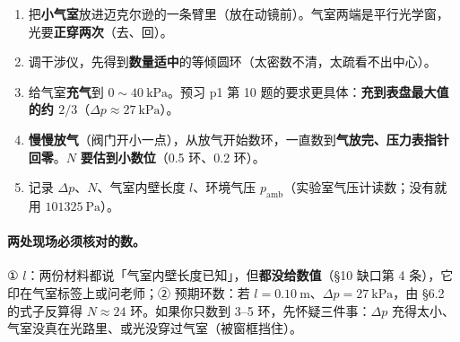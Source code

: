 \documentclass[11pt]{ctexart}
\begin{document}

\begin{enumerate}
\item 把\textbf{小气室}放进迈克尔逊的一条臂里（放在动镜前）。气室两端是平行光学窗，光要\textbf{正穿两次}（去、回）。
\item 调干涉仪，先得到\textbf{数量适中}的等倾圆环（太密数不清，太疏看不出中心）。
\item 给气室\textbf{充气}到 \(0\sim40\ \mathrm{kPa}\)。预习 p1 第 10 题的要求更具体：\textbf{充到表盘最大值的约 \(2/3\)}（\(\Delta p\approx27\ \mathrm{kPa}\)）。
\item \textbf{慢慢放气}（阀门开小一点），从放气开始数环，一直数到\textbf{气放完、压力表指针回零}。\(N\) \textbf{要估到小数位}（0.5 环、0.2 环）。
\item 记录 \(\Delta p\)、\(N\)、气室内壁长度 \(l\)、环境气压 \(p_{\mathrm{amb}}\)（实验室气压计读数；没有就用 \(101325\ \mathrm{Pa}\)）。
\end{enumerate}


\paragraph{两处现场必须核对的数。}① \(l\)：两份材料都说「气室内壁长度已知」，但\textbf{都没给数值}（§10 缺口第 4 条），它印在气室标签上或问老师；② 预期环数：若 \(l=0.10\ \mathrm{m}\)、\(\Delta p=27\ \mathrm{kPa}\)，由 §6.2 的式子反算得 \(N\approx24\) 环。如果你只数到 3--5 环，先怀疑三件事：\(\Delta p\) 充得太小、气室没真在光路里、或光没穿过气室（被窗框挡住）。

\end{document}

